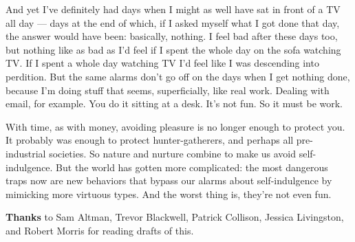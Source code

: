 And yet I've definitely had days when I might as well have sat in front
of a TV all day --- days at the end of which, if I asked myself what I
got done that day, the answer would have been: basically, nothing. I
feel bad after these days too, but nothing like as bad as I'd feel if I
spent the whole day on the sofa watching TV. If I spent a whole day
watching TV I'd feel like I was descending into perdition. But the same
alarms don't go off on the days when I get nothing done, because I'm
doing stuff that seems, superficially, like real work. Dealing with
email, for example. You do it sitting at a desk. It's not fun. So it
must be work.

With time, as with money, avoiding pleasure is no longer enough to
protect you. It probably was enough to protect hunter-gatherers, and
perhaps all pre-industrial societies. So nature and nurture combine to
make us avoid self-indulgence. But the world has gotten more
complicated: the most dangerous traps now are new behaviors that bypass
our alarms about self-indulgence by mimicking more virtuous types. And
the worst thing is, they're not even fun.

\textbf{Thanks} to Sam Altman, Trevor Blackwell, Patrick Collison,
Jessica Livingston, and Robert Morris for reading drafts of this.